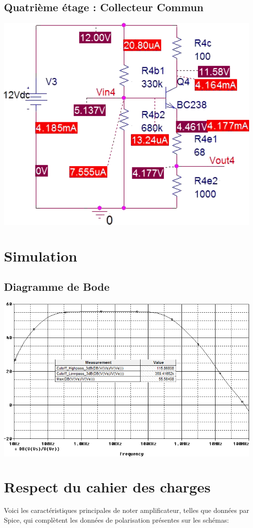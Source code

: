    \subsection{Quatrième étage : Collecteur Commun}
    \includegraphics[width=17cm]{images/4}

  \section{Simulation}
   \subsection{Diagramme de Bode}
    \includegraphics[width=17cm]{images/bode}

  \section{Respect du cahier des charges}
   Voici les caractéristiques principales de noter amplificateur, telles que données par
   Spice, qui complètent les données de polarisation présentes sur les schémas:


